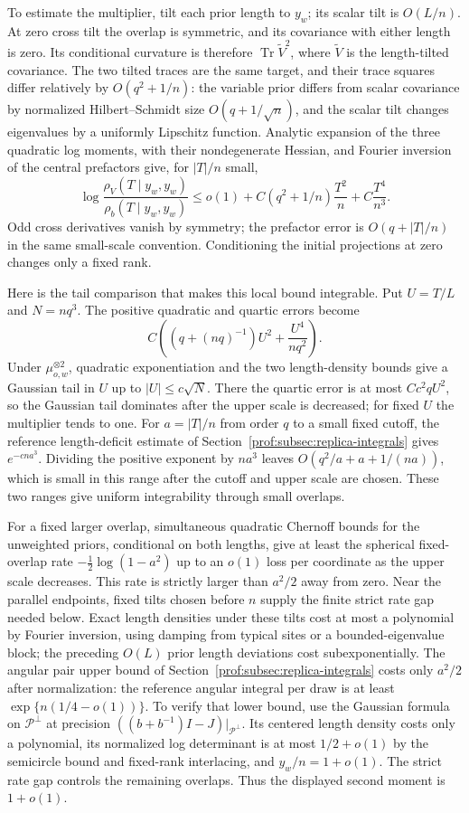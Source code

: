 To estimate the multiplier, tilt each prior length to $y_w$; its
scalar tilt is $O(L/n)$. At zero cross tilt the overlap is symmetric,
and its covariance with either length is zero. Its conditional
curvature is therefore $\operatorname{Tr}\widetilde V^2$, where
$\widetilde V$ is the length-tilted covariance. The two tilted traces
are the same target, and their trace squares differ relatively by
$O(q^2+1/n)$: the variable prior differs from scalar covariance by
normalized Hilbert--Schmidt size $O(q+1/\sqrt n)$, and the scalar tilt
changes eigenvalues by a uniformly Lipschitz function. Analytic
expansion of the three quadratic log moments, with their nondegenerate
Hessian, and Fourier inversion of the central prefactors give, for
$|T|/n$ small,
\[
 \log\frac{\rho_V(T\mid y_w,y_w)}{\rho_b(T\mid y_w,y_w)}
 \le o(1)+C(q^2+1/n)\frac{T^2}{n}+C\frac{T^4}{n^3}.
\]
Odd cross derivatives vanish by symmetry; the prefactor error is
$O(q+|T|/n)$ in the same small-scale convention. Conditioning the
initial projections at zero changes only a fixed rank.

Here is the tail comparison that makes this local bound integrable.
Put $U=T/L$ and $N=nq^3$. The positive quadratic and quartic errors
become
\[
 C\left((q+(nq)^{-1})U^2+\frac{U^4}{nq^2}\right).
\]
Under $\mu_{o,w}^{\otimes2}$, quadratic exponentiation and the two
length-density bounds give a Gaussian tail in $U$ up to
$|U|\le c\sqrt N$. There the quartic error is at most $C c^2qU^2$,
so the Gaussian tail dominates after the upper scale is decreased;
for fixed $U$ the multiplier tends to one. For
$a=|T|/n$ from order $q$ to a small fixed cutoff, the reference
length-deficit estimate of Section~\ref{prof:subsec:replica-integrals}
gives $e^{-cna^3}$. Dividing the positive exponent by $na^3$ leaves
$O(q^2/a+a+1/(na))$, which is small in this range after the cutoff
and upper scale are chosen. These two ranges give uniform integrability
through small overlaps.

For a fixed larger overlap, simultaneous quadratic Chernoff bounds for
the unweighted priors, conditional on both lengths, give at least the
spherical fixed-overlap rate $-\tfrac12\log(1-a^2)$ up to an $o(1)$
loss per coordinate as the upper scale decreases. This rate is strictly
larger than $a^2/2$ away from zero. Near the parallel endpoints, fixed
tilts chosen before $n$ supply the finite strict rate gap needed below.
Exact length densities under these tilts cost at most a polynomial by
Fourier inversion, using damping from typical sites or a bounded-eigenvalue
block; the preceding $O(L)$ prior length deviations cost subexponentially.
The angular pair upper bound of
Section~\ref{prof:subsec:replica-integrals} costs only $a^2/2$ after
normalization: the reference angular integral per draw is at least
$\exp\{n(1/4-o(1))\}$. To verify that lower bound, use the Gaussian
formula on $\mathcal P^\perp$ at precision
$((b+b^{-1})I-J)|_{\mathcal P^\perp}$. Its centered length density
costs only a polynomial, its normalized log determinant is at most
$1/2+o(1)$ by the semicircle bound and fixed-rank interlacing, and
$y_w/n=1+o(1)$. The strict rate gap controls the remaining overlaps.
Thus the displayed second moment is $1+o(1)$.

